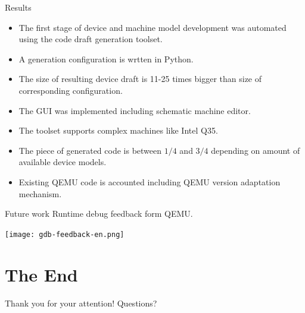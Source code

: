 \documentclass[unicode,hyperref={unicode=true},aspectratio=169]{beamer}
\newcommand*{\sectionpagekb}{\usebeamertemplate*{section page kb}}
\begin{document}
\begin{frame}{Results}
\begin{itemize}
\item The first stage of device and machine model development was automated
using the code draft generation toolset.
\item A generation configuration is wrtten in Python.
\item The size of resulting device draft is 11-25 times bigger than size of
corresponding configuration.
\item The GUI was implemented including schematic machine editor.
\item The toolset supports complex machines like Intel Q35.
\item The piece of generated code is between \(1/4\) and \(3/4\) depending on
amount of available device models.
\item Existing QEMU code is accounted including QEMU version adaptation
mechanism.
\end{itemize}
\end{frame}



\begin{frame}{Future work}
Runtime debug feedback form QEMU.
\vfill
\begin{center}
\texttt{[image: gdb-feedback-en.png]}
\end{center}
\end{frame}



\section{The End}
\begin{frame}{}
\begin{center}
\vfill
\sectionpagekb
\vfill
Thank you for your attention!
\vfill
Questions?
\vfill
\end{center}
\end{frame}
\end{document}
